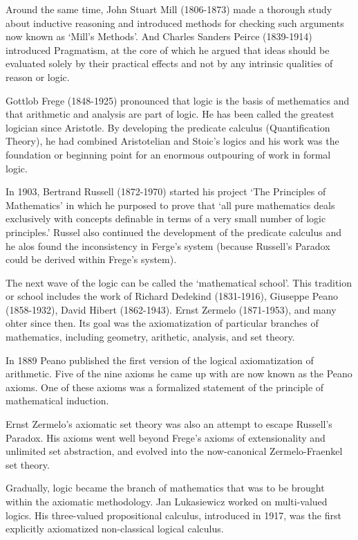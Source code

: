 \documentclass[]{book}
\theoremstyle{definition}
\theoremstyle{definition}
\theoremstyle{definition}
\theoremstyle{remark}
\begin{document}
Around the same time, John Stuart Mill (1806-1873) made a thorough study
about inductive reasoning and introduced methods for checking such
arguments now known as `Mill's Methods'. And Charles Sanders Peirce
(1839-1914) introduced Pragmatism, at the core of which he argued that
ideas should be evaluated solely by their practical effects and not by
any intrinsic qualities of reason or logic.

Gottlob Frege (1848-1925) pronounced that logic is the basis of
methematics and that arithmetic and analysis are part of logic. He has
been called the greatest logician since Aristotle. By developing the
predicate calculus (Quantification Theory), he had combined Aristotelian
and Stoic's logics and his work was the foundation or beginning point
for an enormous outpouring of work in formal logic.

In 1903, Bertrand Russell (1872-1970) started his project `The
Principles of Mathematics' in which he purposed to prove that `all pure
mathematics deals exclusively with concepts definable in terms of a very
small number of logic principles.' Russel also continued the development
of the predicate calculus and he alos found the inconsistency in Ferge's
system (because Russell's Paradox could be derived within Frege's
system).

The next wave of the logic can be called the `mathematical school'. This
tradition or school includes the work of Richard Dedekind (1831-1916),
Giuseppe Peano (1858-1932), David Hibert (1862-1943). Ernst Zermelo
(1871-1953), and many ohter since then. Its goal was the axiomatization
of particular branches of mathematics, including geometry, arithetic,
analysis, and set theory.

In 1889 Peano published the first version of the logical axiomatization
of arithmetic. Five of the nine axioms he came up with are now known as
the Peano axioms. One of these axioms was a formalized statement of the
principle of mathematical induction.

Ernst Zermelo's axiomatic set theory was also an attempt to escape
Russell's Paradox. His axioms went well beyond Frege's axioms of
extensionality and unlimited set abstraction, and evolved into the
now-canonical Zermelo-Fraenkel set theory.

Gradually, logic became the branch of mathematics that was to be brought
within the axiomatic methodology. Jan Lukasiewicz worked on multi-valued
logics. His three-valued propositional calculus, introduced in 1917, was
the first explicitly axiomatized non-classical logical calculus.
\end{document}
